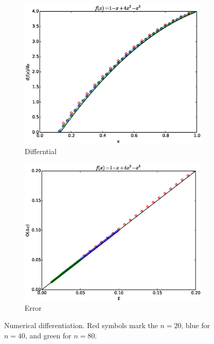 \documentclass{scrartcl}
\begin{document}
\begin{figure}
	\centering
	\begin{subfigure}[b]{0.45\textwidth}
		\includegraphics[width=\textwidth]{deriv.ps}
		\caption{Differntial}
	\end{subfigure}
	\begin{subfigure}[b]{0.45\textwidth}
		\includegraphics[width=\textwidth]{derr.ps}
		\caption{Error}
	\end{subfigure}
	\label{fig:diff}
	\caption{Numerical differentiation.  Red symbols mark the $n=20$, blue for $n=40$, and green for $n=80$.}
\end{figure}
\end{document}
